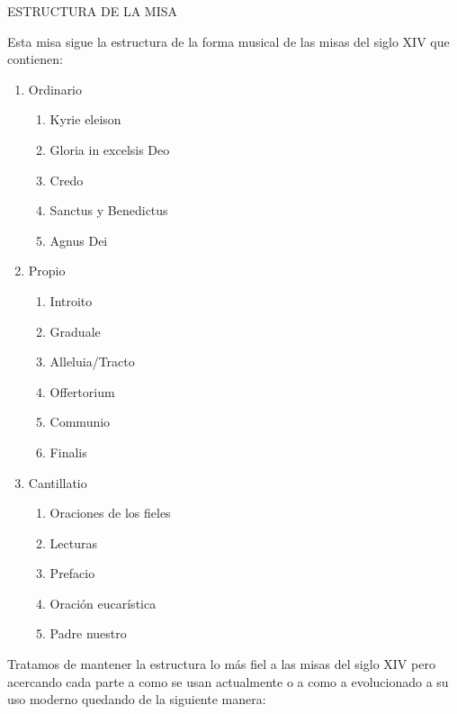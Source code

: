 \documentclass[12pt, letterpaper]{report}
\begin{document}
    \LARGE ESTRUCTURA DE LA MISA

    \Large Esta misa sigue la estructura de la forma musical de las misas del siglo XIV que contienen:

    \renewcommand{\theenumi}{\arabic{enumi}}
    \begin{enumerate}
        \item Ordinario
        \begin{enumerate}
            \item Kyrie eleison
            \item Gloria in excelsis Deo
            \item Credo
            \item Sanctus y Benedictus
            \item Agnus Dei
        \end{enumerate}

        \item Propio
        \begin{enumerate}
            \item Introito
            \item Graduale
            \item Alleluia/Tracto
            \item Offertorium
            \item Communio
            \item Finalis
        \end{enumerate}

        \item Cantillatio
        \begin{enumerate}
            \item Oraciones de los fieles
            \item Lecturas
            \item Prefacio
            \item Oraci\'on eucar\'istica
            \item Padre nuestro
        \end{enumerate}
    \end{enumerate}

    Tratamos de mantener la estructura lo m\'as fiel a las misas del siglo XIV pero acercando cada parte a como se usan actualmente o a como a evolucionado a su uso moderno quedando de la siguiente manera:
\end{document}

